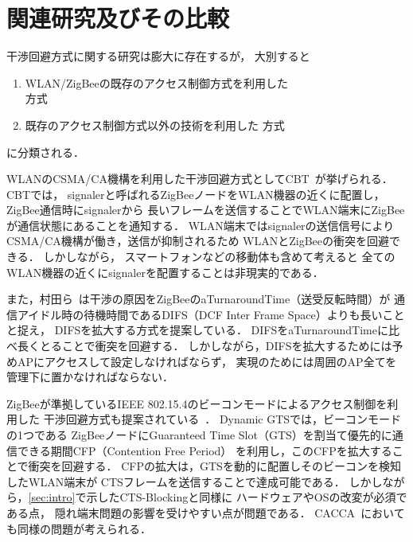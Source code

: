 \documentclass[12pt]{jreport}
\begin{document}
\chapter{関連研究及びその比較}\label{relation}%

干渉回避方式に関する研究は膨大に存在するが，
大別すると
\begin{enumerate}

 \item WLAN/ZigBeeの既存のアクセス制御方式を利用した\\
 方式~\cite{hou09:minimize_intf,zhang11:zigbee_wifi_coexist,murata14:wlan_zigbee,huang09:wlan_zigbee,tytgat12:wlan_zigbee}

 \item 既存のアクセス制御方式以外の技術を利用した
 方式~\cite{huang10:beyond_coexist,liang10:wifi_zigbee_survive}

\end{enumerate}
に分類される．

WLANのCSMA/CA機構を利用した干渉回避方式としてCBT~\cite{zhang11:zigbee_wifi_coexist}が挙げられる．
CBTでは，
signalerと呼ばれるZigBeeノードをWLAN機器の近くに配置し，ZigBee通信時にsignalerから
長いフレームを送信することでWLAN端末にZigBeeが通信状態にあることを通知する．
WLAN端末ではsignalerの送信信号によりCSMA/CA機構が働き，送信が抑制されるため
WLANとZigBeeの衝突を回避できる．
しかしながら，
スマートフォンなどの移動体も含めて考えると
全てのWLAN機器の近くにsignalerを配置することは非現実的である．

また，村田ら~\cite{murata14:wlan_zigbee}は干渉の原因をZigBeeのaTurnaroundTime（送受反転時間）が
通信アイドル時の待機時間であるDIFS（DCF Inter Frame Space）よりも長いことと捉え，
DIFSを拡大する方式を提案している．
DIFSをaTurnaroundTimeに比べ長くとることで衝突を回避する．
しかしながら，DIFSを拡大するためには予めAPにアクセスして設定しなければならず，
実現のためには周囲のAP全てを管理下に置かなければならない．

ZigBeeが準拠しているIEEE 802.15.4のビーコンモードによるアクセス制御を利用した
干渉回避方式も提案されている~\cite{huang09:wlan_zigbee}．
Dynamic GTSでは，ビーコンモードの1つである
ZigBeeノードにGuaranteed Time Slot（GTS）を割当て優先的に通信できる期間CFP（Contention Free Period）
を利用し，このCFPを拡大することで衝突を回避する．
CFPの拡大は，GTSを動的に配置しそのビーコンを検知したWLAN端末が
CTSフレームを送信することで達成可能である．
しかしながら，\ref{sec:intro}で示したCTS-Blockingと同様に
ハードウェアやOSの改変が必須である点，
隠れ端末問題の影響を受けやすい点が問題である．
CACCA~\cite{tytgat12:wlan_zigbee}においても同様の問題が考えられる．
\end{document}
